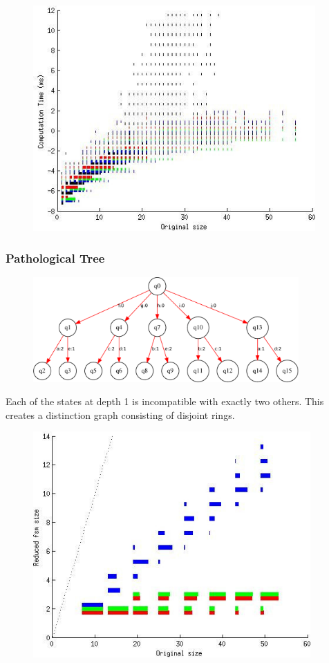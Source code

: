 \documentclass{beamer}
\begin{document}
\begin{frame}
\begin{figure}
\centering
\includegraphics[height=3.4in]{poiss_time.jpg}
\end{figure}
\end{frame}

\begin{frame}
\frametitle{Pathological Tree}
\begin{figure}
\centering
\includegraphics[width=4in]{big_patho_tree.pdf} 
\end{figure}
Each of the states at depth 1 is incompatible with exactly two others.  
This creates a distinction graph consisting of disjoint rings.
\end{frame}

\begin{frame}
\begin{figure}
\centering
\includegraphics[height=3.4in]{patho_orig.jpg}
\end{figure}
\end{frame}
\end{document}
